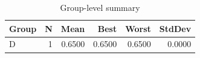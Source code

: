 \begin{table}[htbp]
\centering
\caption{Group-level summary}
\label{tab:group-summary}
\begin{tabular}{lrrrrr}
\toprule
\textbf{Group} & \textbf{N} & \textbf{Mean} & \textbf{Best} & \textbf{Worst} & \textbf{StdDev} \\
\midrule
D & 1 & 0.6500 & 0.6500 & 0.6500 & 0.0000 \\
\bottomrule
\end{tabular}
\end{table}